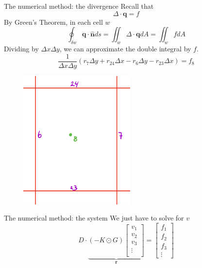 \documentclass{beamer}
\begin{document}
    \begin{frame}{The numerical method: the divergence}
        Recall that
        \begin{equation*}
            \Delta \cdot \bm{q} = f
        \end{equation*}
        By Green's Theorem, in each cell $w$
        \begin{equation*}
            \oint_{\delta w} \bm{q} \cdot \hat{\bm{n}} ds = \iint_w \Delta \cdot \bm{q} dA = \iint_w f dA
        \end{equation*}
        Dividing by $\Delta x \Delta y$, we can approximate the double integral by $f$.
        \begin{equation*}
            \frac{1}{\Delta x \Delta y} (r_7 \Delta y + r_{24} \Delta x - r_6 \Delta y - r_{23}\Delta x) = f_8
        \end{equation*}
        \begin{figure}
            \includegraphics[scale=0.24]{cell.png}
        \end{figure}
    \end{frame}

    \begin{frame}{The numerical method: the system}
        We just have to solve for $v$
        \begin{equation*}
            D \cdot \underbrace{(-K \odot G) 
            \begin{bmatrix}
                v_1 \\
                v_2 \\
                v_3 \\
                \vdots \\
            \end{bmatrix}}_{\bm{r}}
            = 
            \begin{bmatrix}
                f_1 \\
                f_2 \\
                f_3 \\
                \vdots
            \end{bmatrix}
        \end{equation*}
    \end{frame}
\end{document}
